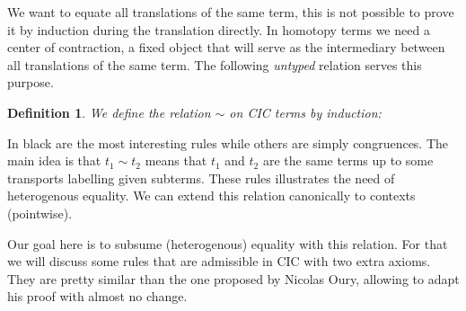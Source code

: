 \documentclass[11pt]{article}
\theoremstyle{plain}
\newtheorem{definition}[theorem]{Definition}
\theoremstyle{remark}
\begin{document}
We want to equate all translations of the same term, this is not possible to
prove it by induction during the translation directly. In homotopy terms
we need a center of contraction, \ie a fixed object that will serve as the
intermediary between all translations of the same term.
The following \emph{untyped} relation serves this purpose.

\begin{definition}
  We define the relation $\sim$ on CIC terms by induction:
  \begin{mathc}
    {\color{gray}
    }
    \qquad
    \qquad
    \qquad
    {\color{gray}
    }
  \end{mathc}
  \begin{mathc}
    \color{gray}
    \qquad
  \end{mathc}
\end{definition}

In black are the most interesting rules while others are simply congruences.
The main idea is that $t_1 \sim t_2$ means that $t_1$ and $t_2$ are the same
terms up to some transports labelling given subterms.
These rules illustrates the need of heterogenous equality.
We can extend this relation canonically to contexts (pointwise).

Our goal here is to subsume (heterogenous) equality with this relation.
For that we will discuss some rules that are admissible in CIC with two extra
axioms. They are pretty similar than the one proposed by Nicolas Oury, allowing
to adapt his proof with almost no change.
\end{document}
